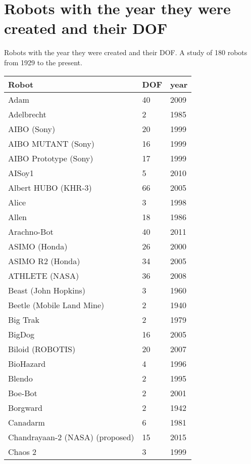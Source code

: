 \chapter{Robots with the year they were created and their DOF}

\begin{center}
\Large
Robots with the year they were created and their DOF.  A study of 180 robots from 1929 to the present.
\normalsize
\begin{longtable}{l | l | l }
\hline
Robot	&	DOF	&	year	\\	\hline
\hline
Adam \cite{robotAdam5197424}	&	40	&	2009	\\	\hline
Adelbrecht	&	2	&	1985	\\	\hline
AIBO (Sony)	&	20	&	1999	\\	\hline
AIBO MUTANT (Sony)	&	16	&	1999	\\	\hline
AIBO Prototype (Sony)	&	17	&	1999	\\	\hline
AISoy1	&	5	&	2010	\\	\hline
Albert HUBO (KHR-3)	&	66	&	2005	\\	\hline
Alice	&	3	&	1998	\\	\hline
Allen	&	18	&	1986	\\	\hline
Arachno-Bot	&	40	&	2011	\\	\hline
ASIMO (Honda) \cite{robotasimo}	&	26	&	2000	\\	\hline
ASIMO R2 \cite{robotasimo} (Honda) \cite{robotasimo}	&	34	&	2005	\\	\hline
ATHLETE (NASA)	&	36	&	2008	\\	\hline
Beast (John Hopkins)	&	3	&	1960	\\	\hline
Beetle (Mobile Land Mine)	&	2	&	1940	\\	\hline
Big Trak	&	2	&	1979	\\	\hline
BigDog \cite{robotbigdog5509226}	&	16	&	2005	\\	\hline
Biloid (ROBOTIS)	&	20	&	2007	\\	\hline
BioHazard	&	4	&	1996	\\	\hline
Blendo	&	2	&	1995	\\	\hline
Boe-Bot	&	2	&	2001	\\	\hline
Borgward	&	2	&	1942	\\	\hline
Canadarm	&	6	&	1981	\\	\hline
Chandrayaan-2 (NASA) (proposed)	&	15	&	2015	\\	\hline
Chaos 2	&	3	&	1999	\\	\hline

\end{longtable}
\end{center}
